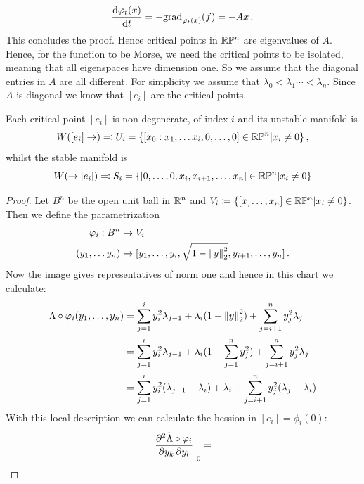 \begin{example}
		\begin{equation*}
			\frac{\mathop{}\!\mathrm{d} \varphi_t(x)}{\mathop{}\!\mathrm{d} t}=-\mathrm{grad}_{\varphi_t(x)}(f)=-Ax\,.
		\end{equation*} This concludes the proof.
		Hence critical points in $\mathbb{R}\mathbb{P}^n$ are eigenvalues of $A$. Hence, for the function to be Morse, we need the critical points to be isolated, meaning that all eigenspaces have dimension one. So we assume that the diagonal entries in $A$ are all different. For simplicity we assume that $\lambda_0<\lambda_1\cdots <\lambda_n$. Since $A$ is diagonal we know that $[e_i]$ are the critical points. 
		\begin{lemma}\label{lem: unstable manifolds of real projective space}
			Each critical point $[e_i]$ is non degenerate, of index $i$ and its unstable manifold is
			\begin{equation*}
				W([e_i]\to)\eqcolon U_i=\{[x_0:x_1,\dots x_i,0,\dots,0]\in \mathbb{R}\mathbb{P}^n| x_i\neq 0\}\,,
			\end{equation*} whilst the stable manifold is
			\begin{equation*}
				W(\to [e_i])\eqcolon S_i=\{[0,\dots,0,x_i,x_{i+1},\dots,x_n]\in\mathbb{R}\mathbb{P}^n|x_i\neq 0\}
			\end{equation*}
		\end{lemma}
		\begin{proof}
			Let $B^n$ be the open unit ball in $\mathbb{R}^n$ and $V_i\coloneq \{[x_,\dots,x_n]\in\mathbb{R}\mathbb{P}^n|x_i\neq 0\}$. Then we define the parametrization
			\begin{align*}
				\varphi_i:B^n &\to V_i\\
				(y_1,\dots y_n)&\mapsto [y_1,\dots,y_i,\sqrt{1-\left\lVert y\right\rVert_2^2},y_{i+1},\dots,y_n]\,.
			\end{align*} Now the image gives representatives of norm one and hence in this chart we calculate:
			\begin{align*}
				\tilde{\Lambda}\circ \varphi_i(y_1,\dots,y_n)
				&= \sum_{j=1}^iy_i^2\lambda_{j-1}+\lambda_i({1-\left\lVert y\right\rVert_2^2})+\sum_{j=i+1}^n y_j^2\lambda_j\\
				&= \sum_{j=1}^iy_i^2\lambda_{j-1}+\lambda_i(1-\sum_{j=1}^n y_j^2 )+\sum_{j=i+1}^n y_j^2\lambda_j \\
				&= \sum_{j=1}^iy_i^2(\lambda_{j-1}-\lambda_i)+\lambda_i+\sum_{j=i+1}^n y_j^2(\lambda_j-\lambda_i)
			\end{align*} With this local description we can calculate the hession in $[e_i]=\phi_i(0)$:
			\begin{equation*}
				\restr{\frac{\partial ^2\tilde{\Lambda}\circ \phi_i}{\partial y_k \, \partial y_l}}{0}=

\end{equation*}
\end{proof}
\end{example}
